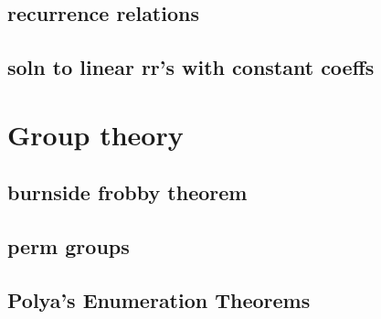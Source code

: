 \subsection{recurrence relations}
\subsection{soln to linear rr's with constant coeffs}
\section{Group theory}
\subsection{burnside frobby theorem}
\subsection{perm groups}
\subsection{Polya's Enumeration Theorems}

